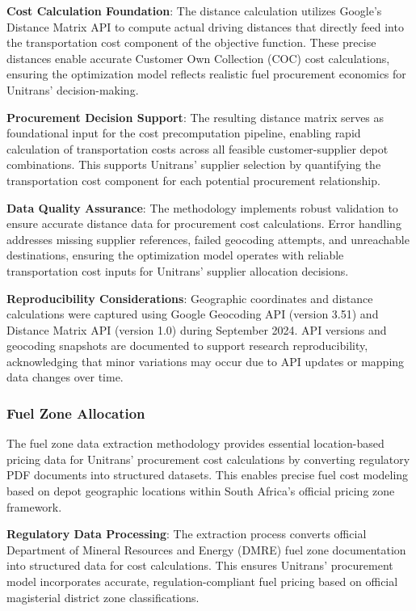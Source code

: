 \textbf{Cost Calculation Foundation}: The distance calculation utilizes Google's Distance Matrix API to compute actual driving distances that directly feed into the transportation cost component of the objective function. These precise distances enable accurate Customer Own Collection (COC) cost calculations, ensuring the optimization model reflects realistic fuel procurement economics for Unitrans' decision-making.

\textbf{Procurement Decision Support}: The resulting distance matrix serves as foundational input for the cost precomputation pipeline, enabling rapid calculation of transportation costs across all feasible customer-supplier depot combinations. This supports Unitrans' supplier selection by quantifying the transportation cost component for each potential procurement relationship.

\textbf{Data Quality Assurance}: The methodology implements robust validation to ensure accurate distance data for procurement cost calculations. Error handling addresses missing supplier references, failed geocoding attempts, and unreachable destinations, ensuring the optimization model operates with reliable transportation cost inputs for Unitrans' supplier allocation decisions.

\textbf{Reproducibility Considerations}: Geographic coordinates and distance calculations were captured using Google Geocoding API (version 3.51) and Distance Matrix API (version 1.0) during September 2024. API versions and geocoding snapshots are documented to support research reproducibility, acknowledging that minor variations may occur due to API updates or mapping data changes over time.

\subsubsection{Fuel Zone Allocation}
The fuel zone data extraction methodology provides essential location-based pricing data for Unitrans' procurement cost calculations by converting regulatory PDF documents into structured datasets. This enables precise fuel cost modeling based on depot geographic locations within South Africa's official pricing zone framework.

\textbf{Regulatory Data Processing}: The extraction process converts official Department of Mineral Resources and Energy (DMRE) fuel zone documentation into structured data for cost calculations. This ensures Unitrans' procurement model incorporates accurate, regulation-compliant fuel pricing based on official magisterial district zone classifications.

